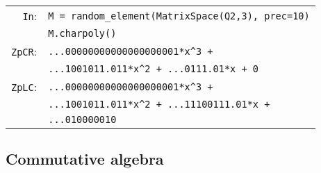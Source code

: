\documentclass[sigconf]{acmart}
\newcommand{\cIn}{{\color{input} \tt \phantom{Zp}In}:}
\newcommand{\cZpCR}{{\color{output} \tt ZpCR}:}
\newcommand{\cZpFP}{{\color{output} \tt ZpFP}:}
\newcommand{\cZpLC}{{\color{output} \tt ZpLC}:}
\newcommand{\cZpLF}{{\color{output} \tt ZpLF}:}
\theoremstyle{definition}
\begin{document}
{\noindent \small
\begin{tabular}{rl}
\cIn
 & \verb?M = ?{\color{function}\verb?random_element?}\verb?(?{\color{constructor}\verb?MatrixSpace?}\verb?(?{\color{ring}\verb?Q2?}\verb?,3), prec=10)? \\
 & \verb?M.?{\color{method}\verb?charpoly?}\verb?()? \\
\cZpCR
 & \verb?...00000000000000000001*x^3 + ? \\
 & \verb?...1001011.011*x^2 + ...0111.01*x + 0? \\
\cZpLC
 & \verb?...00000000000000000001*x^3 + ? \\
 & \verb?...1001011.011*x^2 + ...11100111.01*x +? \\
 & \verb?...010000010? \\
\end{tabular}}


\subsection{Commutative algebra}
\end{document}

